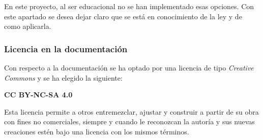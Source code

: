 En este proyecto, al ser educacional no se han implementado esas opciones. Con este apartado se desea dejar claro que se está en conocimiento de la ley y de como aplicarla.


\subsubsection{Licencia en la documentación}

Con respecto a la documentación se ha optado por una licencia de tipo \emph{Creative Commons} y se ha elegido la siguiente:

\textbf{CC BY-NC-SA 4.0}~\cite{creativec}

Esta licencia permite a otros entremezclar, ajustar y construir a partir de su obra con fines no comerciales, siempre y cuando le reconozcan la autoría y sus nuevas creaciones estén bajo una licencia con los mismos términos.

